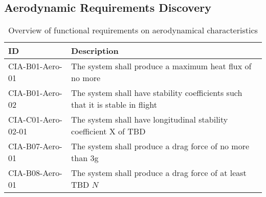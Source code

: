 \subsection{Aerodynamic Requirements Discovery} 
\label{sec:aero}




\begin{table}[h]
	\caption{Overview of functional requirements on aerodynamical characteristics}
	\label{tab:aeroreqs}
	\begin{tabular}{|p{}|p{}|}
		\hline
		ID & Description \\
		\hline \hline
		CIA-B01-Aero-01 & The system shall produce a maximum heat flux of no more \\ \hline
		CIA-B01-Aero-02 & The system shall have stability coefficients such that it is stable in flight \\ \hline
		CIA-C01-Aero-02-01 & The system shall have longitudinal stability coefficient X of TBD \\ \hline
		CIA-B07-Aero-01 & The system shall produce a drag force of no more than 3g \\ \hline
		CIA-B08-Aero-01 & The system shall produce a drag force of at least TBD $N$ \\ \hline
	\end{tabular}
\end{table}